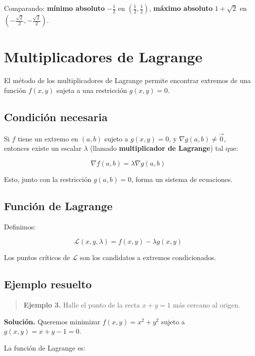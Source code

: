 \documentclass[
]{book}
\begin{document}
Comparando: \textbf{mínimo absoluto} \(-\frac{1}{2}\) en \((\frac{1}{2}, \frac{1}{2})\), \textbf{máximo absoluto} \(1 + \sqrt{2}\) en \((-\frac{\sqrt{2}}{2}, -\frac{\sqrt{2}}{2})\).

\section{Multiplicadores de Lagrange}\label{multiplicadores-de-lagrange}

El método de los multiplicadores de Lagrange permite encontrar extremos de una función \(f(x, y)\) sujeta a una restricción \(g(x, y) = 0\).

\subsection{Condición necesaria}\label{condiciuxf3n-necesaria}

Si \(f\) tiene un extremo en \((a, b)\) sujeto a \(g(x, y) = 0\), y \(\nabla g(a, b) \neq \vec{0}\), entonces existe un escalar \(\lambda\) (llamado \textbf{multiplicador de Lagrange}) tal que:

\[
\nabla f(a, b) = \lambda \nabla g(a, b)
\]

Esto, junto con la restricción \(g(a, b) = 0\), forma un sistema de ecuaciones.

\subsection{Función de Lagrange}\label{funciuxf3n-de-lagrange}

Definimos:

\[
\mathcal{L}(x, y, \lambda) = f(x, y) - \lambda g(x, y)
\]

Los puntos críticos de \(\mathcal{L}\) son los candidatos a extremos condicionados.

\subsection{Ejemplo resuelto}\label{ejemplo-resuelto-15}

\begin{quote}
\textbf{Ejemplo 3.} Halle el punto de la recta \(x + y = 1\) más cercano al origen.
\end{quote}

\textbf{Solución.} Queremos minimizar \(f(x, y) = x^2 + y^2\) sujeto a \(g(x, y) = x + y - 1 = 0\).

La función de Lagrange es:
\end{document}
